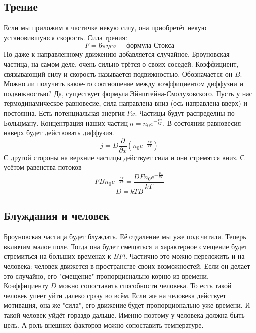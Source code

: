 \documentclass[a4paper, 12pt]{article}
\begin{document}
	\subsection{Трение}
	Если мы приложим к частичке некую силу, она приобретёт некую установившуюся скорость. Сила трения:
	\begin{equation*}
		F = 6 \pi \eta r v - \:	 \text{формула Стокса}
	\end{equation*}
	Но даже к направленному движению добавляется случайное. Броуновская частица, на самом деле, очень сильно трётся о своих соседей. Коэффициент, связывающий силу и скорость называется подвижностью. Обозначается он $B$. Можно ли получить какое-то соотношение между коэффициентом диффузии и подвижностью? Да, существует формула Эйнштейна-Смолуховского. Пусть у нас термодинамическое равновесие, сила направлена вниз (ось направлена вверх) и постоянна. Есть потенциальная энергия $Fx$. Частицы будут распределны по Больцману. Концентрация наших частиц $n = n_{0} e^{-\frac{Fx}{kT}}$. В состоянии равновесия наверх будет действовать диффузия.
	\begin{equation*}
		j = D \frac{\partial}{\partial x} (n_{0} e^{-\frac{Fx}{kT}})
	\end{equation*}
	С другой стороны на верхние частицы действует сила и они стремятся вниз. С усётом равенства потоков
	\begin{equation*}
		FB n_{0} e^{-\frac{Fx}{kT}} = \frac{D F n_{0} e^{-\frac{Fx}{kT}}} {kT}
	\end{equation*}
	\begin{equation*}
		D = kTB
	\end{equation*}
	\subsection{Блуждания и человек}
	Броуновская частица будет блуждать. Её отдаление мы уже подсчитали. Теперь включим малое поле. Тогда она будет смещаться и характерное смещение будет стремиться на больших временах к $BFt$. Частично это можно переложить и на человека: человек движется в пространстве своих возможностей. Если он делает это случайно, его "смещение" пропорционально корню из времени. Коэффициенту $D$ можно сопоставить способности человека. То есть такой человек упеет уйти далеко сразу во всём. Если же на человека действует мотивация, она же "сила", его движение будет пропорционально уже времени. И такой человек уйдёт гораздо дальше. Именно поэтому у человека должна быть цель. А роль внешних факторов можно сопоставить температуре. 
\end{document}
